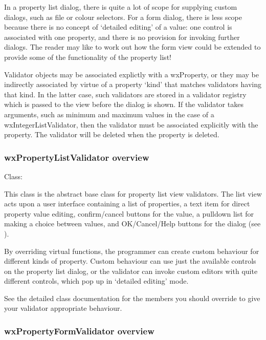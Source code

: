 In a property list dialog, there is quite a lot of scope for supplying custom dialogs,
such as file or colour selectors. For a form dialog, there is less scope because
there is no concept of `detailed editing' of a value: one control is associated with
one property, and there is no provision for invoking further dialogs. The reader
may like to work out how the form view could be extended to provide some of the
functionality of the property list!

Validator objects may be associated explictly with a wxProperty, or they may be
indirectly associated by virtue of a property `kind' that matches validators having
that kind. In the latter case, such validators are stored in a validator registry
which is passed to the view before the dialog is shown. If the validator takes
arguments, such as minimum and maximum values in the case of a wxIntegerListValidator,
then the validator must be associated explicitly with the property. The validator
will be deleted when the property is deleted.

\subsubsection{wxPropertyListValidator overview}\label{wxpropertylistvalidatoroverview}

Class: 

This class is the abstract base class for property list view validators.
The list view acts upon a user interface containing a list of properties,
a text item for direct property value editing, confirm/cancel buttons for the value,
a pulldown list for making a choice between values, and OK/Cancel/Help buttons
for the dialog (see ).

By overriding virtual functions, the programmer can create custom
behaviour for different kinds of property. Custom behaviour can use just the
available controls on the property list dialog, or the validator can
invoke custom editors with quite different controls, which pop up in
`detailed editing' mode.

See the detailed class documentation for the members you should override
to give your validator appropriate behaviour.

\subsubsection{wxPropertyFormValidator overview}\label{wxpropertyformvalidatoroverview}

